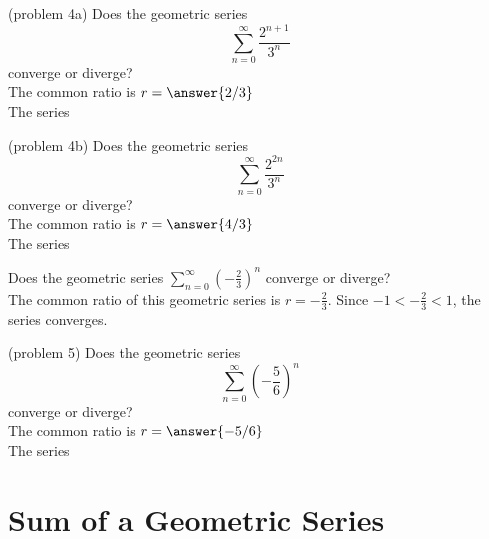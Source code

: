 \documentclass{ximera}
\begin{document}
\begin{problem}(problem 4a)
 Does the geometric series
 \[
 \sum_{n=0}^\infty \frac{2^{n+1}}{3^n} 
 \]
 converge or diverge?\\
 The common ratio is $r = \answer{2/3}$\\
 The series
 \begin{multipleChoice}
 \end{multipleChoice}
 \end{problem}
 
 
 \begin{problem}(problem 4b)
 Does the geometric series
 \[
 \sum_{n=0}^\infty \frac{2^{2n}}{3^n} 
 \]
 converge or diverge?\\
 The common ratio is $r = \answer{4/3}$\\
 The series
 \begin{multipleChoice}
 \end{multipleChoice}
 \end{problem}
 

\begin{example}[example 5]
Does the geometric series $\displaystyle{\sum_{n=0}^\infty \left(-\frac23\right)^n }$ converge or diverge?\\
The common ratio of this geometric series is $r = -\frac23$. Since $-1 < -\frac23 < 1$,
the series converges.
\end{example}

\begin{problem}(problem 5)
 Does the geometric series
 \[
 \sum_{n=0}^\infty \left(-\frac56 \right)^n
 \]
 converge or diverge?\\
 The common ratio is $r = \answer{-5/6}$\\
 The series
 \begin{multipleChoice}
 \end{multipleChoice}
 \end{problem}

\section{Sum of a Geometric Series}
\end{document}
